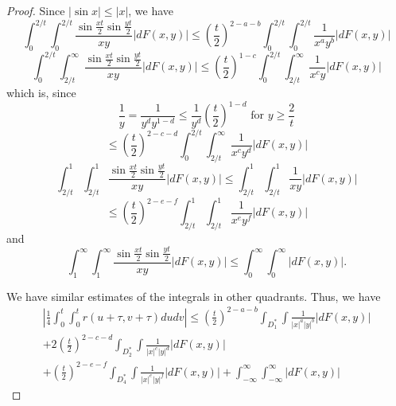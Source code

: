 \documentclass{article}
\begin{document}
\begin{proof}
Since $|\sin x| \leq |x|$, we have
\begin{equation}\label{eq:35}
\int_{0}^{2/t} \int_{0}^{2/t} \frac{\sin \frac{xt}{2} \sin \frac{yt}{2}}{xy}|dF(x,y)| \leq \left(\frac{t}{2}\right)^{2-a-b} \int_{0}^{2/t} \int_{0}^{2/t} \frac{1}{x^{a}y^{b}}|dF(x,y)|
\end{equation}
\begin{equation}\label{eq:36}
\int_{0}^{2/t} \int_{2/t}^{\infty} \frac{\sin \frac{xt}{2} \sin \frac{yt}{2}}{xy}|dF(x,y)| \leq \left(\frac{t}{2}\right)^{1-c} \int_{0}^{2/t} \int_{2/t}^{\infty} \frac{1}{x^{c}y}|dF(x,y)|
\end{equation}
which is, since
\begin{equation}\label{eq:37}
\frac{1}{y}=\frac{1}{y^{d}y^{1-d}} \leq \frac{1}{y^{d}}\left(\frac{t}{2}\right)^{1-d} \text{ for } y \geq \frac{2}{t}
\end{equation}
\begin{equation}\label{eq:38}
\leq \left(\frac{t}{2}\right)^{2-c-d} \int_{0}^{2/t} \int_{2/t}^{\infty} \frac{1}{x^{c}y^{d}}|dF(x,y)|
\end{equation}
\begin{equation}\label{eq:39}
\int_{2/t}^{1} \int_{2/t}^{1} \frac{\sin \frac{xt}{2} \sin \frac{yt}{2}}{xy}|dF(x,y)| \leq \int_{2/t}^{1} \int_{2/t}^{1} \frac{1}{xy}|dF(x,y)|
\end{equation}
\begin{equation}\label{eq:40}
\leq \left(\frac{t}{2}\right)^{2-e-f} \int_{2/t}^{1} \int_{2/t}^{1} \frac{1}{x^{e}y^{f}}|dF(x,y)|
\end{equation}
and
\begin{equation}\label{eq:41}
\int_{1}^{\infty} \int_{1}^{\infty} \frac{\sin \frac{xt}{2} \sin \frac{yt}{2}}{xy}|dF(x,y)| \leq \int_{0}^{\infty} \int_{0}^{\infty}|dF(x,y)|.
\end{equation}

We have similar estimates of the integrals in other quadrants. Thus, we have
\begin{equation}\label{eq:42}
\begin{split}
\left|\frac{1}{4} \int_{0}^{t} \int_{0}^{t} r(u+\tau, v+\tau) dudv\right| 
\leq \left(\frac{t}{2}\right)^{2-a-b} \int_{D_{1}^{*}} \int \frac{1}{|x|^{a}|y|^{b}}|dF(x,y)| \\
+ 2\left(\frac{t}{2}\right)^{2-c-d} \int_{D_{2}^{*}} \int \frac{1}{|x|^{c}|y|^{d}}|dF(x,y)| \\
+ \left(\frac{t}{2}\right)^{2-e-f} \int_{D_{4}^{*}} \int \frac{1}{|x|^{e}|y|^{f}}|dF(x,y)| + \int_{-\infty}^{\infty} \int_{-\infty}^{\infty}|dF(x,y)|
\end{split}
\end{equation}


\end{proof}
\end{document}
